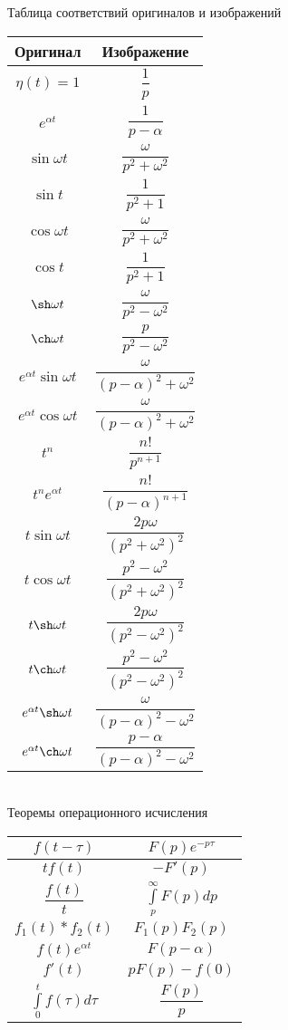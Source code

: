 \documentclass{article}
\numberwithin{equation}{section}
\begin{document}
\begin{center}
Таблица соответствий оригиналов и изображений\\\vspace*{0.5cm}
\begin{tabular}{|c|c|}
\hline
Оригинал & Изображение \\ \hline
$\eta(t)=1$ & $\dfrac{1}{p}$ \\ \hline
$e^{\alpha t}$ & $\dfrac{1}{p-\alpha}$ \\ \hline
$\sin\omega t$ & $\dfrac{\omega}{p^2+\omega^2}$ \\ \hline
$\sin t$ & $\dfrac{1}{p^2+1}$ \\ \hline
$\cos\omega t$ & $\dfrac{\omega}{p^2+\omega^2}$ \\ \hline
$\cos t$ & $\dfrac{1}{p^2+1}$ \\ \hline
$\sh\omega t$ & $\dfrac{\omega}{p^2-\omega^2}$ \\ \hline
$\ch\omega t$ & $\dfrac{p}{p^2-\omega^2}$ \\ \hline
$e^{\alpha t}\sin\omega t$ & $\dfrac{\omega}{(p-\alpha)^2+\omega^2}$ \\ \hline
$e^{\alpha t}\cos\omega t$ & $\dfrac{\omega}{(p-\alpha)^2+\omega^2}$ \\ \hline
$t^n$ & $\dfrac{n!}{p^{n+1}}$ \\ \hline
$t^ne^{\alpha t}$ & $\dfrac{n!}{(p-\alpha)^{n+1}}$ \\ \hline
$t\sin\omega t$ & $\dfrac{2p\omega}{(p^2+\omega^2)^2}$ \\ \hline
$t\cos\omega t$ & $\dfrac{p^2-\omega^2}{(p^2+\omega^2)^2}$ \\ \hline
$t\sh\omega t$ & $\dfrac{2p\omega}{(p^2-\omega^2)^2}$ \\ \hline
$t\ch\omega t$ & $\dfrac{p^2-\omega^2}{(p^2-\omega^2)^2}$ \\ \hline
$e^{\alpha t}\sh\omega t$ & $\dfrac{\omega}{(p-\alpha)^2-\omega^2}$ \\ \hline
$e^{\alpha t}\ch\omega t$ & $\dfrac{p-\alpha}{(p-\alpha)^2-\omega^2}$ \\ \hline
\end{tabular}\\\vspace*{0.5cm}
Теоремы операционного исчисления\\\vspace*{0.5cm}
\begin{tabular}{|c|c|}
\hline
$f(t-\tau)$ & $F(p)e^{-p\tau}$ \\ \hline
$tf(t)$ & $-F'(p)$ \\ \hline
$\dfrac{f(t)}{t}$ & $\int\limits_p^\infty F(p)dp$ \\ \hline
$f_1(t)*f_2(t)$ & $F_1(p)F_2(p)$ \\ \hline
$f(t)e^{\alpha t}$ & $F(p-\alpha)$ \\ \hline
$f'(t)$ & $pF(p)-f(0)$ \\ \hline
$\int\limits_0^t f(\tau)d\tau$ & $\dfrac{F(p)}{p}$ \\ \hline
\end{tabular}
\end{center}
\end{document}
